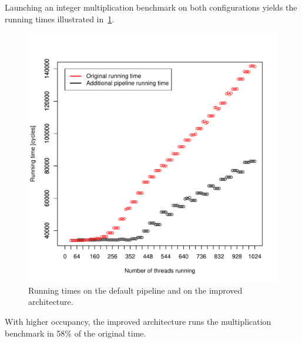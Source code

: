 \documentclass{report}
\begin{document}
    Launching an integer multiplication benchmark on both configurations yields the running
    times illustrated in~\ref{fig:time_improvement}. 
    \begin{figure}[H]
    \centering
        \includegraphics[width=0.9\linewidth]{graphics/improvement-graph}
        \captionsetup{justification=centering}
        \caption{Running times on the default pipeline and on the improved architecture.}
        \label{fig:time_improvement}
    \end{figure}
    
    With higher occupancy, the improved architecture runs the multiplication benchmark in 58\% of the original time.
\end{document}
